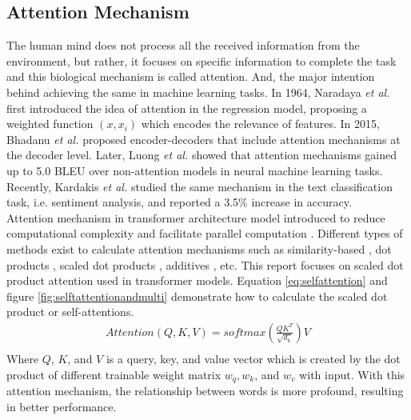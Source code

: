 \documentclass[%
	BCOR=8mm, %
	DIV=12,
	toc=bibliography, %
	toc=listof, %
	oneside, %
	egregdoesnotlikesansseriftitles, %
	]{scrbook}
\begin{document}
\subsection{Attention Mechanism}
The human mind does not process all the received information from the environment, but rather, it focuses on specific information to complete the task and this biological mechanism is called attention. And, the major intention behind achieving the same in machine learning tasks. In 1964, Naradaya \textit{et al.} \cite{nadaraya_estimating_1964} first introduced the idea of attention in the regression model, proposing a weighted function $(x,x_{i})$ which encodes the relevance of features. In 2015, Bhadanu \textit{et al.} \cite{bahdanau_neural_2015} proposed encoder-decoders that include attention mechanisms at the decoder level. Later, Luong \textit{et al.} \cite{luong_effective_2015} showed that attention mechanisms gained up to 5.0 BLEU over non-attention models in neural machine learning tasks. Recently, Kardakis \textit{et al.} \cite{kardakis_examining_2021} studied the same mechanism in the text classification task, i.e. sentiment analysis, and reported a 3.5\% increase in accuracy.\\
Attention mechanism in transformer architecture model introduced to reduce computational complexity and facilitate parallel computation \cite{vaswani_attention_2017}. Different types of methods exist to calculate attention mechanisms such as similarity-based \cite{graves_neural_2014}, dot products \cite{luong_effective_2015}, scaled dot products \cite{vaswani_attention_2017}, additives \cite{bahdanau_neural_2015}, etc. This report focuses on scaled dot product attention used in transformer models. Equation  \ref{eq:selfattention} and figure \ref{fig:selftattentionandmulti} demonstrate how to calculate the scaled dot product or self-attentions.
\begin{equation}
    \begin{aligned}
        Attention(Q,K,V)=softmax(\frac{QK^T}{\sqrt{d_{k}}})V\\
        \label{eq:selfattention}
    \end{aligned}
\end{equation}
Where $Q$, $K$, and $V$ is a query, key, and value vector which is created  by the dot product of different trainable weight matrix $w_{q},w_{k}$, and $ w_{v}$ with input. With this attention mechanism, the relationship between words is more profound, resulting in better performance.\\
\end{document}
